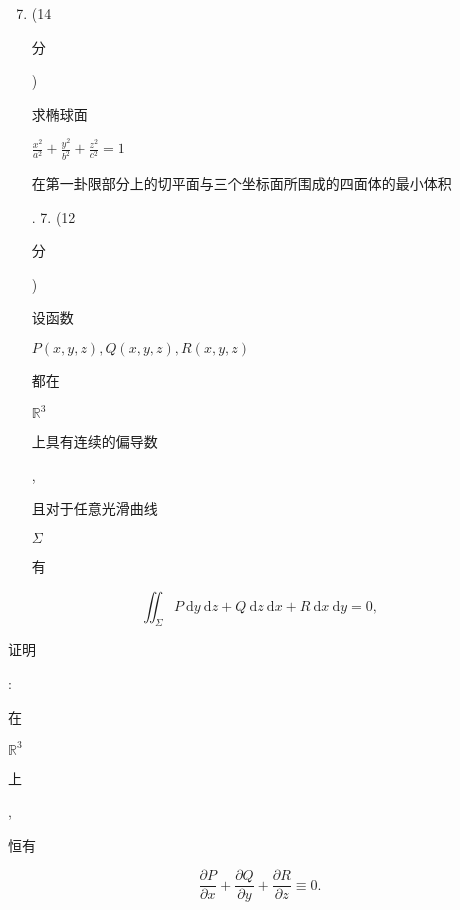 \documentclass[10pt]{article}
\begin{document}
\begin{enumerate}
  \setcounter{enumi}{6}
  \item (14 \begin{CJK}{UTF8}{mj}分\end{CJK}) \begin{CJK}{UTF8}{mj}求椭球面\end{CJK} $\frac{x^{2}}{a^{2}}+\frac{y^{2}}{b^{2}}+\frac{z^{2}}{c^{2}}=1$ \begin{CJK}{UTF8}{mj}在第一卦限部分上的切平面与三个坐标面所围成的四面体的最小体积\end{CJK}. 7. (12 \begin{CJK}{UTF8}{mj}分\end{CJK}) \begin{CJK}{UTF8}{mj}设函数\end{CJK} $P(x, y, z), Q(x, y, z), R(x, y, z)$ \begin{CJK}{UTF8}{mj}都在\end{CJK} $\mathbb{R}^{3}$ \begin{CJK}{UTF8}{mj}上具有连续的偏导数\end{CJK}, \begin{CJK}{UTF8}{mj}且对于任意光滑曲线\end{CJK} $\Sigma$ \begin{CJK}{UTF8}{mj}有\end{CJK}
\end{enumerate}
$$
\iint_{\Sigma} P \mathrm{~d} y \mathrm{~d} z+Q \mathrm{~d} z \mathrm{~d} x+R \mathrm{~d} x \mathrm{~d} y=0,
$$
\begin{CJK}{UTF8}{mj}证明\end{CJK}: \begin{CJK}{UTF8}{mj}在\end{CJK} $\mathbb{R}^{3}$ \begin{CJK}{UTF8}{mj}上\end{CJK}, \begin{CJK}{UTF8}{mj}恒有\end{CJK}
$$
\frac{\partial P}{\partial x}+\frac{\partial Q}{\partial y}+\frac{\partial R}{\partial z} \equiv 0 .
$$
\end{document}
